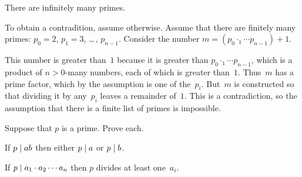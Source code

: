 \documentclass{ibl}
\begin{document}
\begin{ex}
There are infinitely many primes.  
\begin{ans}
To obtain a contradition, assume otherwise.
Assume that there are finitely many primes: 
$p_0=2$, $p_1=3$, \ldots\,, $p_{n-1}$.
Consider the number $m=(p_0\cdotp_1\cdots p_{n-1})+1$.

This number is greater than~$1$ because it is greater than 
$p_0\cdotp_1\cdots p_{n-1}$, 
which is a product of $n>0$-many numbers, each of which is greater than~$1$.
Thus~$m$ has a prime factor, which by the assumption is one of the~$p_i$.
But~$m$ is constructed so that dividing it by any~$p_i$ 
leaves a remainder of~$1$.
This is a contradiction, so the assumption that there is a finite
list of primes is impossible.
\end{ans}
\end{ex}

\begin{ex}  Suppose that $p$ is a prime.  Prove each.
\begin{exes}
\item If  $p\mid ab$ then either $p\mid a$ or
$p\mid b$.
\item If $p\mid a_1\cdot a_2\cdots a_n$ then 
$p$ divides at least one~$a_i$.    
\end{exes}
\begin{ans}
\begin{exes}
\item     
\end{exes}
\end{ans}
\end{ex}
\end{document}
